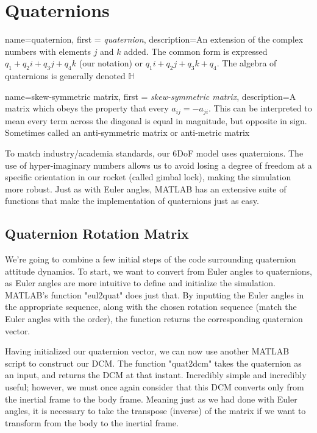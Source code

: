 \documentclass[12pt]{report}
\begin{document}
\section{Quaternions}\label{sec:quaternions}
{
    name=quaternion,
    first = {\textit{quaternion}},
    description={An extension of the complex numbers with elements $j$ and $k$ added. The common form is expressed $q_1+q_2i+q_3j+q_4k$ (our notation) or $q_1i+q_2j+q_3k+q_4$. The algebra of quaternions is generally denoted $\mathbb{H}$}
}

{
    name=skew-symmetric matrix,
    first = {\textit{skew-symmetric matrix}},
    description={A matrix which obeys the property that every $a_{ij}=-a_{ji}$. This can be interpreted to mean every term across the diagonal is equal in magnitude, but opposite in sign. Sometimes called an anti-symmetric matrix or anti-metric matrix}
}

To match industry/academia standards, our 6DoF model uses \glspl{quaternion}. The use of hyper-imaginary numbers allows us to avoid losing a degree of freedom at a specific orientation in our rocket (called gimbal lock), making the simulation more robust. Just as with \gls{Euler angles}, MATLAB has an extensive suite of functions that make the implementation of \glspl{quaternion} just as easy. 

\subsection{Quaternion Rotation Matrix}

We're going to combine a few initial steps of the code surrounding \gls{quaternion} attitude dynamics. To start, we want to convert from \gls{Euler angles} to \glspl{quaternion}, as \gls{Euler angles} are more intuitive to define and initialize the simulation. MATLAB's function "eul2quat" does just that. By inputting the \gls{Euler angles} in the appropriate sequence, along with the chosen rotation sequence (match the \gls{Euler angles} with the order), the function returns the corresponding \gls{quaternion} vector. 

Having initialized our \gls{quaternion} vector, we can now use another MATLAB script to construct our DCM. The function "quat2dcm" takes the \gls{quaternion} as an input, and returns the DCM at that instant. Incredibly simple and incredibly useful; however, we must once again consider that this DCM converts only from the \gls{inertial frame} to the \gls{body frame}. Meaning just as we had done with \gls{Euler angles}, it is necessary to take the transpose (inverse) of the matrix if we want to transform from the body to the \gls{inertial frame}.
\end{document}
